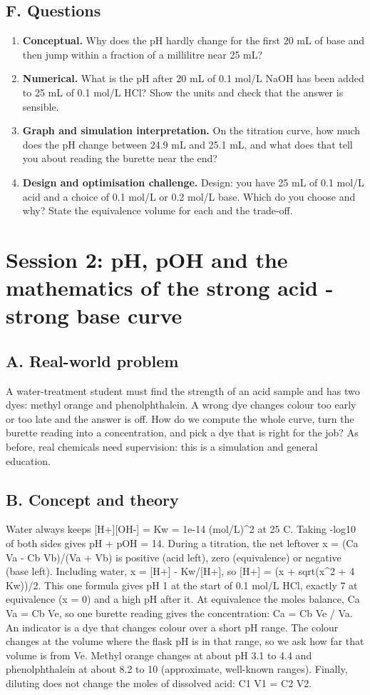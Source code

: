 \documentclass[11pt,a4paper]{article}
\begin{document}
\subsection*{F. Questions}
\begin{enumerate}[nosep]
\item \textbf{Conceptual.} Why does the pH hardly change for the first 20 mL of base and then jump within a fraction of a millilitre near 25 mL?
\item \textbf{Numerical.} What is the pH after 20 mL of 0.1 mol/L NaOH has been added to 25 mL of 0.1 mol/L HCl? Show the units and check that the answer is sensible.
\item \textbf{Graph and simulation interpretation.} On the titration curve, how much does the pH change between 24.9 mL and 25.1 mL, and what does that tell you about reading the burette near the end?
\item \textbf{Design and optimisation challenge.} Design: you have 25 mL of 0.1 mol/L acid and a choice of 0.1 mol/L or 0.2 mol/L base. Which do you choose and why? State the equivalence volume for each and the trade-off.
\end{enumerate}

\section{Session 2: pH, pOH and the mathematics of the strong acid - strong base curve}

\subsection*{A. Real-world problem}
A water-treatment student must find the strength of an acid sample and has two dyes: methyl orange and phenolphthalein. A wrong dye changes colour too early or too late and the answer is off. How do we compute the whole curve, turn the burette reading into a concentration, and pick a dye that is right for the job? As before, real chemicals need supervision: this is a simulation and general education.

\subsection*{B. Concept and theory}
Water always keeps [H+][OH-] = Kw = 1e-14 (mol/L)\textasciicircum{}2 at 25 C. Taking -log10 of both sides gives pH + pOH = 14. During a titration, the net leftover x = (Ca Va - Cb Vb)/(Va + Vb) is positive (acid left), zero (equivalence) or negative (base left). Including water, x = [H+] - Kw/[H+], so [H+] = (x + sqrt(x\textasciicircum{}2 + 4 Kw))/2. This one formula gives pH 1 at the start of 0.1 mol/L HCl, exactly 7 at equivalence (x = 0) and a high pH after it. At equivalence the moles balance, Ca Va = Cb Ve, so one burette reading gives the concentration: Ca = Cb Ve / Va. An indicator is a dye that changes colour over a short pH range. The colour changes at the volume where the flask pH is in that range, so we ask how far that volume is from Ve. Methyl orange changes at about pH 3.1 to 4.4 and phenolphthalein at about 8.2 to 10 (approximate, well-known ranges). Finally, diluting does not change the moles of dissolved acid: C1 V1 = C2 V2.
\end{document}
